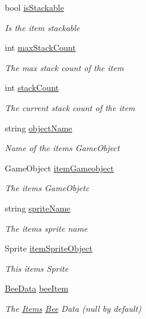 \begin{DoxyCompactItemize}
bool \hyperlink{struct_bee_game_1_1_items_1_1_item_a2a58e4a805a560661ce6a4f1f21bfa1d}{is\+Stackable}
\begin{DoxyCompactList}\small\item\em Is the item stackable \end{DoxyCompactList}\item 
int \hyperlink{struct_bee_game_1_1_items_1_1_item_a045f162bbb378f44e8b89af901b29ff3}{max\+Stack\+Count}
\begin{DoxyCompactList}\small\item\em The max stack count of the item \end{DoxyCompactList}\item 
int \hyperlink{struct_bee_game_1_1_items_1_1_item_aaa169917b0e0f8472f20398d5d448388}{stack\+Count}
\begin{DoxyCompactList}\small\item\em The current stack count of the item \end{DoxyCompactList}\item 
string \hyperlink{struct_bee_game_1_1_items_1_1_item_ade55c08e49c1c4017c91978119876387}{object\+Name}
\begin{DoxyCompactList}\small\item\em Name of the items Game\+Object \end{DoxyCompactList}\item 
Game\+Object \hyperlink{struct_bee_game_1_1_items_1_1_item_af28a8cd4a0eff9d4c18189c5ab525f18}{item\+Gameobject}
\begin{DoxyCompactList}\small\item\em The items Game\+Objetc \end{DoxyCompactList}\item 
string \hyperlink{struct_bee_game_1_1_items_1_1_item_a268ba3cca2e9fa79fb5aff3c880f6505}{sprite\+Name}
\begin{DoxyCompactList}\small\item\em The items sprite name \end{DoxyCompactList}\item 
Sprite \hyperlink{struct_bee_game_1_1_items_1_1_item_abd1dd5d605d0768bce6402f64f5cb699}{item\+Sprite\+Object}
\begin{DoxyCompactList}\small\item\em This items Sprite \end{DoxyCompactList}\item 
\hyperlink{struct_bee_game_1_1_bee_1_1_bee_data}{Bee\+Data} \hyperlink{struct_bee_game_1_1_items_1_1_item_a0593f3b7b3ff5daa864f3c6d0ccd77ca}{bee\+Item}
\begin{DoxyCompactList}\small\item\em The \hyperlink{namespace_bee_game_1_1_items}{Items} \hyperlink{namespace_bee_game_1_1_bee}{Bee} Data (null by default) \end{DoxyCompactList}\end{DoxyCompactItemize}


